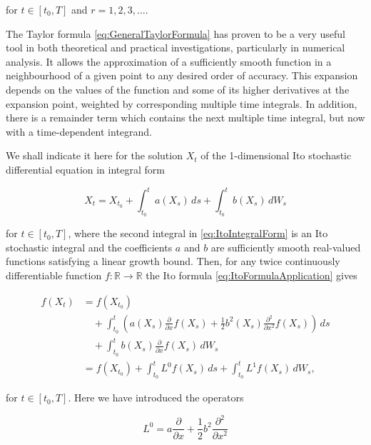 \noindent for \(t \in [t_0, T]\) and \(r = 1, 2, 3, \dots\).

The Taylor formula \eqref{eq:GeneralTaylorFormula} has proven to be a very useful tool in both theoretical and practical investigations, particularly in numerical analysis. It allows the approximation of a sufficiently smooth function in a neighbourhood of a given point to any desired order of accuracy. This expansion depends on the values of the function and some of its higher derivatives at the expansion point, weighted by corresponding multiple time integrals. In addition, there is a remainder term which contains the next multiple time integral, but now with a time-dependent integrand.

We shall indicate it here for the solution \(X_t\) of the 1-dimensional Ito stochastic differential equation in integral form

\begin{equation} \label{eq:ItoIntegralForm}
    X_t = X_{t_0} + \int_{t_0}^t a(X_s) \, ds + \int_{t_0}^t b(X_s) \, dW_s
\end{equation}

\noindent for \(t \in [t_0, T]\), where the second integral in \eqref{eq:ItoIntegralForm} is an Ito stochastic integral and the coefficients \(a\) and \(b\) are sufficiently smooth real-valued functions satisfying a linear growth bound. Then, for any twice continuously differentiable function \(f : \mathbb{R} \to \mathbb{R}\) the Ito formula \cref{eq:ItoFormulaApplication} gives

\begin{equation} \label{eq:ItoFormulaApplication}
\begin{split}
    f(X_t) &= f(X_{t_0}) \\
    &\quad + \int_{t_0}^t \left( a(X_s)\frac{\partial}{\partial x}f(X_s) + \frac{1}{2}b^2(X_s)\frac{\partial^2}{\partial x^2}f(X_s) \right) \, ds \\
    &\quad + \int_{t_0}^t b(X_s)\frac{\partial}{\partial x}f(X_s) \, dW_s \\
    &= f(X_{t_0}) + \int_{t_0}^t L^0 f(X_s) \, ds + \int_{t_0}^t L^1 f(X_s) \, dW_s,
\end{split}
\end{equation}

\noindent for \(t \in [t_0, T]\). Here we have introduced the operators

\begin{equation} \label{eq:OperatorL0}
    L^0 = a \frac{\partial}{\partial x} + \frac{1}{2}b^2 \frac{\partial^2}{\partial x^2}
\end{equation}

